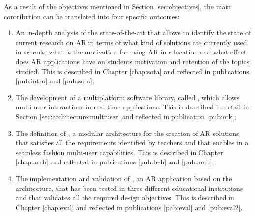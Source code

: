As a result of the objectives mentioned in Section \ref{sec:objectives}, the main contribution can be translated into four specific outcomes:
\begin{enumerate}[start=1,,ref=C.\arabic*,label={\bfseries C\arabic*:}]
    \item An in-depth analysis of the state-of-the-art that allows to identify the state of current research on AR in terms of what kind of solutions are currently used in schools, what is the motivation for using AR in education and what effect does AR applications have on students motivation and retention of the topics studied. This is described in Chapter \ref{chap:sota} and reflected in publications \ref{pub:intro} and \ref{pub:sota}; \label{con:sota}
    \item The development of a multiplatform software library, called \textit{\ork{}}, which allows multi-user interactions in real-time applications. This is described in detail in Section \ref{sec:architecture:multiuser} and reflected in publication \ref{pub:ork};\label{con:ork}
    \item The definition of \arch, a modular architecture for the creation of AR solutions that satisfies all the requirements identified by teachers and that enables in a seamless fashion multi-user capabilities. This is described in Chapter \ref{chap:arch} and reflected in publications \ref{pub:beh} and \ref{pub:arch};\label{con:arch}
    \item The implementation and validation of \appname{}, an AR application based on the architecture, that has been tested in three different educational institutions and that validates all the required design objectives. This is described in Chapter \ref{chap:eval} and reflected in publications \ref{pub:eval} and \ref{pub:eval2}.\label{con:eval}
\end{enumerate}

